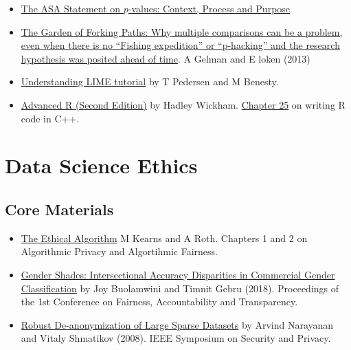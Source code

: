 \documentclass[
  12pt,
]{book}
\begin{document}
\begin{itemize}
\item
  \href{https://library-search.imperial.ac.uk/discovery/fulldisplay?docid=cdi_informaworld_taylorfrancis_310_1080_00031305_2016_1154108\&context=PC\&vid=44IMP_INST:ICL_VU1\&lang=en\&search_scope=MyInst_and_CI\&adaptor=Primo\%20Central\&tab=Everything\&query=any,contains,ASA\%20p-value\&offset=0}{The ASA Statement on \(p\)-values: Context, Process and Purpose}
\item
  \href{http://stat.columbia.edu/~gelman/research/unpublished/forking.pdf}{The Garden of Forking Paths: Why multiple comparisons can be a problem,
  even when there is no ``Fishing expedition'' or ``p-hacking'' and the research
  hypothesis was posited ahead of time}. A Gelman and E loken (2013)
\item
  \href{https://cran.r-project.org/web/packages/lime/vignettes/Understanding_lime.html}{Understanding LIME tutorial} by T Pedersen and M Benesty.
\item
  \href{https://adv-r.hadley.nz/index.html}{Advanced R (Second Edition)} by Hadley Wickham. \href{https://adv-r.hadley.nz/rcpp.html}{Chapter 25} on writing R code in C++.
\end{itemize}

\hypertarget{data-science-ethics}{%
\section{Data Science Ethics}\label{data-science-ethics}}

\hypertarget{core-materials-4}{%
\subsection*{Core Materials}\label{core-materials-4}}

\begin{itemize}
\item
  \href{https://library-search.imperial.ac.uk/discovery/fulldisplay?docid=alma991000531083101591\&context=L\&vid=44IMP_INST:ICL_VU1\&lang=en\&search_scope=MyInst_and_CI\&adaptor=Local\%20Search\%20Engine\&tab=Everything\&query=any,contains,kearns\%20and\%20roth\&mode=Basic}{The Ethical Algorithm} M Kearns and A Roth. Chapters 1 and 2 on Algorithmic Privacy and Algortihmic Fairness.
\item
  \href{https://proceedings.mlr.press/v81/buolamwini18a.html}{Gender Shades: Intersectional Accuracy Disparities in Commercial Gender Classification} by Joy Buolamwini and Timnit Gebru (2018). Proceedings of the 1st Conference on Fairness, Accountability and Transparency.
\item
  \href{https://ieeexplore.ieee.org/document/4531148}{Robust De-anonymization of Large Sparse Datasets} by Arvind Narayanan and Vitaly Shmatikov (2008). IEEE Symposium on Security and Privacy.
\end{itemize}
\end{document}
